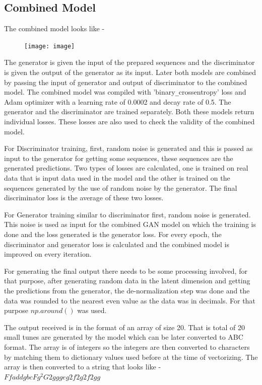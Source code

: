 \documentclass[oneside,12pt]{Classes/RoboticsLaTeX}
\begin{document}
\subsection{Combined Model}

The combined model looks like - 

\begin{figure}[H]
  \texttt{[image: image]}
  \centering
\end{figure}

The generator is given the input of the prepared sequences and the discriminator is given the output of the generator as its input. Later both models are combined by passing the input of generator and output of discriminator to the combined model. The combined model was compiled with 'binary\verb|_|crossentropy' loss and Adam optimizer with a learning rate of 0.0002 and decay rate of 0.5.
The generator and the discriminator are trained separately. Both these models return individual losses. These losses are also used to check the validity of the combined model.

For Discriminator training, first, random noise is generated and this is passed as input to the generator for getting some sequences, these sequences are the generated predictions. Two types of losses are calculated, one is trained on real data that is input data used in the model and the other is trained on the sequences generated by the use of random noise by the generator. The final discriminator loss is the average of these two losses.

For Generator training similar to discriminator first, random noise is generated. This noise is used as input for the combined GAN model on which the training is done and the loss generated is the generator loss. For every epoch, the discriminator and generator loss is calculated and the combined model is improved on every iteration. 

For generating the final output there needs to be some processing involved, for that purpose, after generating random data in the latent dimension and getting the predictions from the generator, the de-normalization step was done and the data was rounded to the nearest even value as the data was in decimals. For that purpose $np.around()$ was used.

The output received is in the format of an array of size 20. That is total of 20 small tunes are generated by the model which can be later converted to ABC format. The array is of integers so the integers are then converted to characters by matching them to dictionary values used before at the time of vectorizing. The array is then converted to a string that looks like -  $FfaddgbcFg^2G2gggeg2f2g2f2gg$
\end{document}
